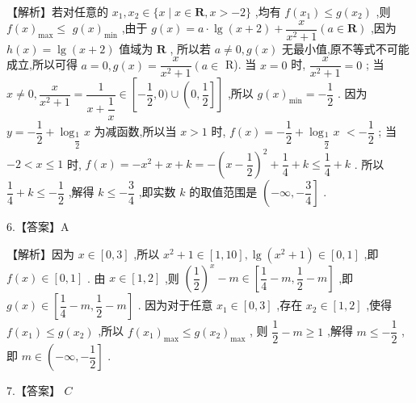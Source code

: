 \documentclass[10pt]{article}
\begin{document}
【解析】若对任意的 ${x}_{1},{x}_{2} \in  \{ x \mid  x \in  \mathbf{R},x >  - 2\}$ ,均有 $f\left( {x}_{1}\right)  \leq  g\left( {x}_{2}\right)$ ,则 $f{\left( x\right) }_{\max } \leq$  $g{\left( x\right) }_{\min }$ ,由于 $g\left( x\right)  = a \cdot  \lg \left( {x + 2}\right)  + \dfrac{x}{{x}^{2} + 1}\left( {a \in  \mathbf{R}}\right)$ ,因为 $h\left( x\right)  = \lg \left( {x + 2}\right)$ 值域为 $\mathbf{R}$ , 所以若 $a \neq  0,g\left( x\right)$ 无最小值,原不等式不可能成立,所以可得 $a = 0,g\left( x\right)  = \dfrac{x}{{x}^{2} + 1}\left( {a \in  }\right.$ R). 当 $x = 0$ 时, $\dfrac{x}{{x}^{2} + 1} = 0$ ; 当 $x \neq  0,\dfrac{x}{{x}^{2} + 1} = \dfrac{1}{x + \dfrac{1}{x}} \in  \left\lbrack  {-\dfrac{1}{2},0) \cup  \left( {0,\dfrac{1}{2}}\right\rbrack  }\right\rbrack$ ,所以 $g{\left( x\right) }_{\min } =  - \dfrac{1}{2}$ . 因为 $y =  - \dfrac{1}{2} + {\log }_{\dfrac{1}{2}}x$ 为减函数,所以当 $x > 1$ 时, $f\left( x\right)  =  - \dfrac{1}{2} + {\log }_{\dfrac{1}{2}}x$  $<  - \dfrac{1}{2}$ ; 当 $- 2 < x \leq  1$ 时, $f\left( x\right)  =  - {x}^{2} + x + k =  - {\left( x - \dfrac{1}{2}\right) }^{2} + \dfrac{1}{4} + k \leq  \dfrac{1}{4} + k$ . 所以 $\dfrac{1}{4} + k \leq   - \dfrac{1}{2}$ ,解得 $k \leq   - \dfrac{3}{4}$ ,即实数 $k$ 的取值范围是 $\left( {-\infty , - \dfrac{3}{4}}\right\rbrack$ .

6.【答案】A

【解析】因为 $x \in  \left\lbrack  {0,3}\right\rbrack$ ,所以 ${x}^{2} + 1 \in  \left\lbrack  {1,{10}}\right\rbrack  ,\lg \left( {{x}^{2} + 1}\right)  \in  \left\lbrack  {0,1}\right\rbrack$ ,即 $f\left( x\right)  \in  \left\lbrack  {0,1}\right\rbrack$ . 由 $x \in  \left\lbrack  {1,2}\right\rbrack$ ,则 ${\left( \dfrac{1}{2}\right) }^{x} - m \in  \left\lbrack  {\dfrac{1}{4} - m,\dfrac{1}{2} - m}\right\rbrack$ ,即 $g\left( x\right)  \in  \left\lbrack  {\dfrac{1}{4} - m,\dfrac{1}{2} - m}\right\rbrack$ . 因为对于任意 ${x}_{1} \in  \left\lbrack  {0,3}\right\rbrack$ ,存在 ${x}_{2} \in  \left\lbrack  {1,2}\right\rbrack$ ,使得 $f\left( {x}_{1}\right)  \leq  g\left( {x}_{2}\right)$ ,所以 $f{\left( {x}_{1}\right) }_{\max } \leq  g{\left( {x}_{2}\right) }_{\max }$ , 则 $\dfrac{1}{2} - m \geq  1$ ,解得 $m \leq   - \dfrac{1}{2}$ ,即 $m \in  \left( {-\infty , - \dfrac{1}{2}}\right\rbrack$ .

7.【答案】 ${C}$
\end{document}
